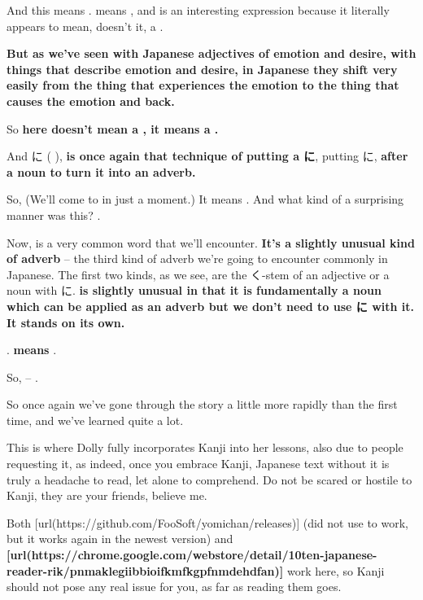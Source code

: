 {}

And this means .  means , and  is an interesting expression because it literally appears to mean, doesn't it, a .

\thinrule

{\bf But as we've seen with Japanese adjectives of emotion and desire, with things that describe emotion and desire, in Japanese they shift very easily from the thing that experiences the emotion to the thing that causes the emotion and back.}

So {\bf {} here doesn't mean a , it means a .}

\thinrule

And に ( ), {\bf is once again that technique of putting a に}, putting に, {\bf after a noun to turn it into an adverb.}

So,  (We'll come to  in just a moment.) It means . And what kind of a surprising manner was this? .

\stopsectionlevel

\startsectionlevel[title={ゆっくり adverb},reference={ゆっくり-adverb}]

Now,  is a very common word that we'll encounter. {\bf It's a slightly unusual kind of adverb} -- the third kind of adverb we're going to encounter commonly in Japanese. The first two kinds, as we see, are the く-stem of an adjective or a noun with に. {\bf {} is slightly unusual in that it is fundamentally a noun which can be applied as an adverb but we don't need to use に with it. It stands on its own.}

\thinrule

. {\bf {} means }.

{}

So,  -- .

So once again we've gone through the story a little more rapidly than the first time, and we've learned quite a lot.

This is where Dolly fully incorporates Kanji into her lessons, also due to people requesting it, as indeed, once you embrace Kanji, Japanese text without it is truly a headache to read, let alone to comprehend. Do not be scared or hostile to Kanji, they are your friends, believe me.

Both [url(https://github.com/FooSoft/yomichan/releases)] (did not use to work, but it works again in the newest version) and {\bf {}[url(https://chrome.google.com/webstore/detail/10ten-japanese-reader-rik/pnmaklegiibbioifkmfkgpfnmdehdfan)]} work here, so Kanji should not pose any real issue for you, as far as reading them goes.

\stopsectionlevel

\stopsectionlevel
